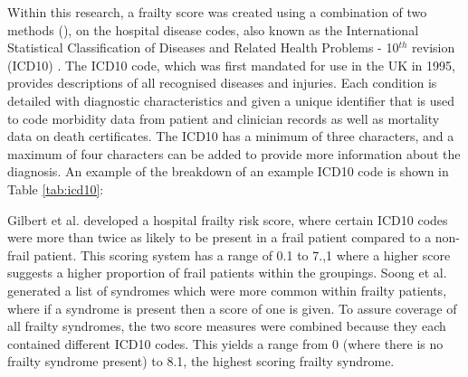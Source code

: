\documentclass[../thesis.tex]{subfiles}
\begin{document}
Within this research, a frailty score was created using a combination of two methods (\cite{Gilbert2018, Soong2015}), on the hospital disease codes, also known as the International Statistical Classification of Diseases and Related Health Problems - 10$^{th}$ revision (ICD10) \cite{NHSWales}. The ICD10 code, which was first mandated for use in the UK in 1995, provides descriptions of all recognised diseases and injuries. Each condition is detailed with diagnostic characteristics and given a unique identifier that is used to code morbidity data from patient and clinician records as well as mortality data on death certificates. The ICD10 has a minimum of three characters, and a maximum of four characters can be added to provide more information about the diagnosis. An example of the breakdown of an example ICD10 code is shown in Table \ref{tab:icd10}:

\begin{table}[h!]
    \centering{}
    \caption{Breakdown of the Example ICD10 Code - S42.201A}
    \label{tab:icd10}
\end{table}

Gilbert et al. \cite{Gilbert2018} developed a hospital frailty risk score, where certain ICD10 codes were more than twice as likely to be present in a frail patient compared to a non-frail patient. This scoring system has a range of 0.1 to 7.,1 where a higher score suggests a higher proportion of frail patients within the groupings. Soong et al. \cite{Soong2015} generated a list of syndromes which were more common within frailty patients, where if a syndrome is present then a score of one is given. To assure coverage of all frailty syndromes, the two score measures were combined because they each contained different ICD10 codes. This yields a range from 0 (where there is no frailty syndrome present) to 8.1, the highest scoring frailty syndrome.
\end{document}
